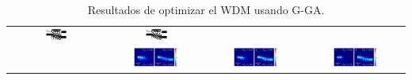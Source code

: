 \begin{landscape}
\begin{table}[ht]
\begin{tabular}{|c|c|c|c|}
      \includegraphics[width=0.24\textwidth]{image/results/wdm/GA/visualize_eps_disc_512.png} &
      \includegraphics[width=0.24\textwidth]{image/results/wdm/GA/visualize_eps_fab_512.png} \\
      \cline{2-4}
      &
      \includegraphics[width=0.50\textwidth]{image/results/wdm/GA/visualize_field_cont_512.png} &
      \includegraphics[width=0.50\textwidth]{image/results/wdm/GA/visualize_field_disc_512.png} &
      \includegraphics[width=0.50\textwidth]{image/results/wdm/GA/visualize_field_fab_512.png} \\
    \hline
    \end{tabular}
    \hspace*{-5cm}
    \caption{Resultados de optimizar el WDM usando G-GA.}
    \label{tab:opt-GA-wdm}
\end{table}
\end{landscape}

